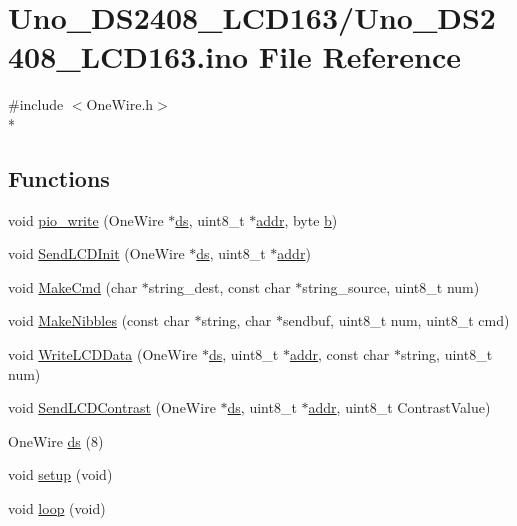 \hypertarget{Uno__DS2408__LCD163_8ino}{\section{Uno\-\_\-\-D\-S2408\-\_\-\-L\-C\-D163/\-Uno\-\_\-\-D\-S2408\-\_\-\-L\-C\-D163.ino File Reference}
\label{Uno__DS2408__LCD163_8ino}
}
{\ttfamily \#include $<$One\-Wire.\-h$>$}\\*
\subsection*{Functions}
\begin{DoxyCompactItemize}
\item 
void \hyperlink{Uno__DS2408__LCD163_8ino_a1e26c3a08c3767822ad391876a888fcf}{pio\-\_\-write} (One\-Wire $\ast$\hyperlink{OWRain1_8ino_af75456870b9486275b406e13b003fb11}{ds}, uint8\-\_\-t $\ast$\hyperlink{OWP__DG__1w-adaptor_8ino_a0fc5da2e63a94559429ec9aec32f1831}{addr}, byte \hyperlink{IMU_8cpp_a20f3a6e8a2ba2537edf801801628417b}{b})
\item 
void \hyperlink{Uno__DS2408__LCD163_8ino_a0346e7b740407034d2bd4974762115d5}{Send\-L\-C\-D\-Init} (One\-Wire $\ast$\hyperlink{OWRain1_8ino_af75456870b9486275b406e13b003fb11}{ds}, uint8\-\_\-t $\ast$\hyperlink{OWP__DG__1w-adaptor_8ino_a0fc5da2e63a94559429ec9aec32f1831}{addr})
\item 
void \hyperlink{Uno__DS2408__LCD163_8ino_a34e523420897686f200125c51e7ef477}{Make\-Cmd} (char $\ast$string\-\_\-dest, const char $\ast$string\-\_\-source, uint8\-\_\-t num)
\item 
void \hyperlink{Uno__DS2408__LCD163_8ino_af148812f3aa653dad493157fd0b7d7f8}{Make\-Nibbles} (const char $\ast$string, char $\ast$sendbuf, uint8\-\_\-t num, uint8\-\_\-t cmd)
\item 
void \hyperlink{Uno__DS2408__LCD163_8ino_aab2d9ea3e3ecace8e6d48c296ec9b622}{Write\-L\-C\-D\-Data} (One\-Wire $\ast$\hyperlink{OWRain1_8ino_af75456870b9486275b406e13b003fb11}{ds}, uint8\-\_\-t $\ast$\hyperlink{OWP__DG__1w-adaptor_8ino_a0fc5da2e63a94559429ec9aec32f1831}{addr}, const char $\ast$string, uint8\-\_\-t num)
\item 
void \hyperlink{Uno__DS2408__LCD163_8ino_a7e7f45f7deffa7054df42395788edf9c}{Send\-L\-C\-D\-Contrast} (One\-Wire $\ast$\hyperlink{OWRain1_8ino_af75456870b9486275b406e13b003fb11}{ds}, uint8\-\_\-t $\ast$\hyperlink{OWP__DG__1w-adaptor_8ino_a0fc5da2e63a94559429ec9aec32f1831}{addr}, uint8\-\_\-t Contrast\-Value)
\item 
One\-Wire \hyperlink{Uno__DS2408__LCD163_8ino_a7c78cdb37808e2d6d5aaab9ea7aca561}{ds} (8)
\item 
void \hyperlink{Uno__DS2408__LCD163_8ino_a7dfd9b79bc5a37d7df40207afbc5431f}{setup} (void)
\item 
void \hyperlink{Uno__DS2408__LCD163_8ino_a0b33edabd7f1c4e4a0bf32c67269be2f}{loop} (void)
\end{DoxyCompactItemize}
